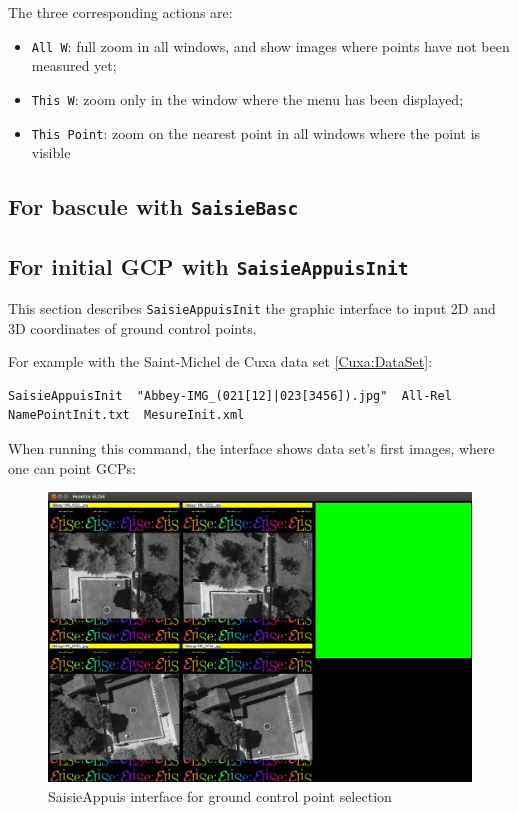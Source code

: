 The three corresponding actions are:

\begin{itemize}
\item {\tt All W}: full zoom in all windows, and show images where points have not been measured yet;
\item {\tt This W}: zoom only in the window where the menu has been displayed;
\item {\tt This Point}: zoom on the nearest point in all windows where the point is visible
\end{itemize}


\subsection{For bascule with {\tt SaisieBasc}}

\label{SaisieBasc}
\subsection{For initial GCP  with {\tt SaisieAppuisInit}}
\label{SaisieAppuisInit}

This section describes {\tt SaisieAppuisInit} the graphic interface to input 2D and 3D coordinates of ground control points.

For example with the Saint-Michel de Cuxa data set \ref{Cuxa:DataSet}:

\begin{verbatim}
SaisieAppuisInit  "Abbey-IMG_(021[12]|023[3456]).jpg"  All-Rel  NamePointInit.txt  MesureInit.xml
\end{verbatim}

When running this command, the interface shows data set's first images, where one can point GCPs:

\begin{figure}[H]
\begin{center}
\includegraphics[width=150mm]{FIGS/Saisie/interface.jpg}
\end{center}
\caption{SaisieAppuis interface for ground control point selection}
\label{FIG:SaisieAppuis:interface}
\end{figure}

